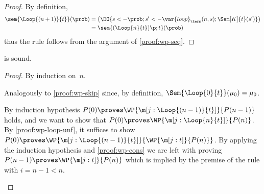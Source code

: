 \begin{proof}
  By definition,
  \begin{align*}
    \sem{\Loop{(n+1)}{t}}(\prob)
    &= \bigl(
         \DO{s <- \prob; s' <- \var{loop}_{\term}(n,s); \Sem[K]{t}(s')}
       \bigr) \\
    &= \sem{(\Loop{n}{t})\p;t}(\prob)
  \end{align*}
  thus the rule follows from the argument of \cref{proof:wp-seq}.
\end{proof} \begin{lemma}
\label{proof:wp-loop}
   is sound.
\end{lemma}

\begin{proof}
  By induction on~$n$.
  \begin{induction}
    \step[Base case~$n=0$]
      Analogously to \cref{proof:wp-skip}
      since, by definition,
      $\Sem{\Loop{0}{t}}(\mu_0) = \mu_0$.

      By induction hypothesis
      $P(0) \proves \WP{\m[j: \Loop{(n-1)}{t}]}{P(n-1)}$ holds,
      and we want to show that
      $P(0) \proves \WP{\m[j: \Loop{n}{t}]}{P(n)}$.
      By \cref{proof:wp-loop-unf},
      it suffices to show
      $ P(0) \proves \WP{\m[j: \Loop{(n-1)}{t}]}{\WP {\m[j:t]}{P(n)}} $.
      By applying the induction hypothesis and \cref{proof:wp-cons} we are left
      with proving
      $ P(n-1) \proves \WP {\m[j:t]}{P(n)} $
      which is implied by the premise of the rule with $i=n-1 < n$.
    \qedhere
  \end{induction}
\end{proof}
